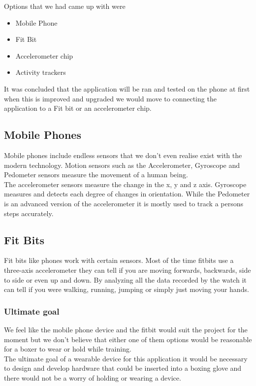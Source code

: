 \documentclass[a4paper,12pt]{report}
\begin{document}
Options that we had came up with were 
\begin{itemize}
    \item Mobile Phone 
    \item Fit Bit
    \item Accelerometer chip
    \item Activity trackers
\end{itemize}

It was concluded that the application will be ran and tested on the phone at first when this is improved and upgraded we would move to connecting the application to a Fit bit or an accelerometer chip.

\subsection{Mobile Phones}
Mobile phones include endless sensors that we don't even realise exist with the modern technology.
Motion sensors such as the Accelerometer, Gyroscope and Pedometer sensors measure the movement of a human being. \\

The accelerometer sensors measure the change in the x, y and z axis. Gyroscope measures and detects each degree of changes in orientation. While the Pedometer is an advanced version of the accelerometer it is mostly used to track a persons steps accurately.\cite{sensorsPhone}   

\subsection{Fit Bits}

Fit bits like phones work with certain sensors. Most of the time fitbits use a three-axis accelerometer they can tell if you are moving forwards, backwards, side to side or even up and down.
By analyzing all the data recorded by the watch it can tell if you were walking, running, jumping or simply just moving your hands.\cite{sensorsFitbit}

\subsubsection{Ultimate goal}
We feel like the mobile phone device and the fitbit would suit the project for the moment but we don't believe that either one of them options would be reasonable for a boxer to wear or hold while training.\\

The ultimate goal of a wearable device for this application it would be necessary to design and develop hardware that could be inserted into a boxing glove and there would not be a worry of holding or wearing a device.
\newpage
\end{document}

